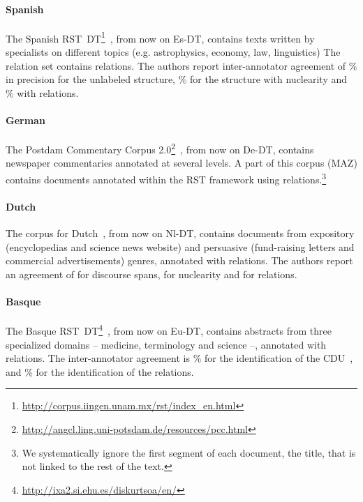 \documentclass[11pt]{article}
\newcommand{\pcc}{De-DT}
\newcommand{\barst}{Eu-DT}
\newcommand{\sprst}{Es-DT}
\newcommand{\durst}{Nl-DT}
\begin{document}
\paragraph{Spanish}

The Spanish RST~DT\footnote{\url{http://corpus.iingen.unam.mx/rst/index_en.html}}~\cite{dacunha:spanish:2011}, from now on \sprst, contains  texts written by specialists on different topics (e.g. astrophysics, economy, law, linguistics)
The relation set contains  relations.
The authors report inter-annotator agreement of \% in precision for the unlabeled structure, \% for the structure with nuclearity and \% with relations.

\paragraph{German}

The Postdam Commentary  Corpus 2.0\footnote{\url{http://angcl.ling.uni-potsdam.de/resources/pcc.html}}~\cite{stede:postdam:2004,stede:postdam:2014}, from now on \pcc, contains newspaper commentaries annotated at several levels.
A part of this corpus (MAZ) contains  documents annotated within the  RST framework using  relations.\footnote{We systematically ignore the first segment of each document, the title, that is not linked to the rest of the text.}

\paragraph{Dutch}
The corpus for Dutch~\cite{vliet:building:2011,redeker:multi:2012}, from now on \durst, contains  documents from expository (encyclopedias and science news website) and persuasive (fund-raising letters and commercial advertisements) genres, annotated with  relations.
The authors report an agreement of  for discourse spans,  for nuclearity and  for relations.


\paragraph{Basque}

 The Basque RST~DT\footnote{\url{http://ixa2.si.ehu.es/diskurtsoa/en/}}~\cite{iruskieta:basque:2013}, from now on \barst, contains  abstracts from three specialized domains -- medicine, terminology and science --, annotated with  relations.
 The inter-annotator agreement is \% for the identification of the CDU~\cite{iruskieta:qualitative:2015}, and \% for the identification of the relations.
\end{document}
